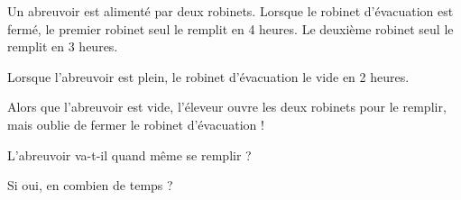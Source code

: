 \begin{enigme}[Étourdi !]
Un abreuvoir est alimenté par deux robinets. Lorsque le robinet d'évacuation est fermé, le premier robinet seul le remplit en 4 heures. Le deuxième robinet seul le remplit en 3 heures.

\vspace{.5em}

Lorsque l'abreuvoir est plein, le robinet d'évacuation le vide en 2 heures.

\vspace{.5em}

Alors que l'abreuvoir est vide, l'éleveur ouvre les deux robinets pour le remplir,
mais oublie de fermer le robinet d'évacuation !

\vspace{.5em}

L'abreuvoir va-t-il quand même se remplir ?

Si oui, en combien de temps ?
\end{enigme}
